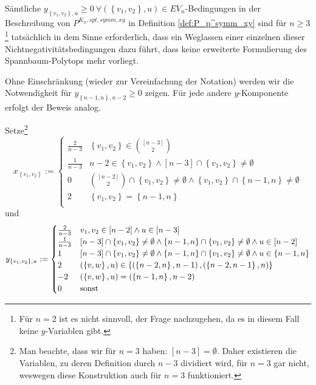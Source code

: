 \documentclass[10p,a4paper,BCOR = 12mm, DIV=15]{scrbook}
\begin{document}
\begin{Sa}
Sämtliche $y_{\left\{v_1, v_2\right\}, u} \geq 0 \ \forall \left(\left\{v_1, v_2\right\}, u\right) \in EV_n$-Bedingungen in der Beschreibung von $P^{K_n, spt, symm, xy}$ in Definition \ref{def:P_p^symm_xy} sind für $n\geq 3$\footnote{Für $n=2$ ist es nicht sinnvoll, der Frage nachzugehen, da es in diesem Fall keine $y$-Variablen gibt.} tatsächlich in dem Sinne erforderlich, dass ein Weglassen einer einzelnen dieser Nichtnegativitätsbedingungen dazu führt, dass keine erweiterte Formulierung des Spannbaum-Polytops mehr vorliegt.
\end{Sa}
\begin{bew}
Ohne Einschränkung (wieder zur Vereinfachung der Notation) werden wir die Notwendigkeit für $y_{\left\{n-1, n\right\}, n-2} \geq 0$ zeigen. Für jede andere $y$-Komponente erfolgt der Beweis analog.

Setze\footnote{Man beachte, dass wir für $n=3$  haben: $\left[n-3\right] = \emptyset$. Daher existieren die Variablen, zu deren Definition durch $n-3$ dividiert wird, für $n=3$ gar nicht, weswegen diese Konstruktion auch für $n=3$ funktioniert.}
\begin{displaymath}
x_{\left\{v_1, v_2\right\}} := \begin{cases}
\frac{2}{n-3} & \left\{v_1, v_2\right\} \in {[n-3] \choose 2} \\
\frac{1}{n-3} & n-2 \in \left\{v_1, v_2\right\} \wedge \left[n-3\right] \cap \left\{v_1, v_2\right\} \neq \emptyset \\
0 & {[n-2] \choose 2} \cap \left\{v_1, v_2\right\} \neq \emptyset \wedge \left\{v_1, v_2\right\} \cap \left\{n-1, n\right\} \neq \emptyset \\
2 & \left\{v_1, v_2\right\} = \left\{n-1, n\right\} \\
\end{cases}
\end{displaymath}
und
\begin{displaymath}
y_{\left\{v_1, v_2\right\}, u} := \begin{cases}
\frac{2}{n-3} & v_1, v_2 \in \left[n-2\right] \wedge u \in \left[n-3\right] \\
\frac{1}{n-3} & \left[n-3\right] \cap \left\{v_1, v_2\right\} \neq \emptyset \wedge \left\{n-1, n\right\} \cap \left\{v_1, v_2\right\} \neq \emptyset \wedge u\in \left[n-2\right] \\
1 & \left[n-3\right] \cap \left\{v_1, v_2\right\} \neq \emptyset \wedge \left\{n-1, n\right\} \cap \left\{v_1, v_2\right\} \neq \emptyset \wedge u\in \left\{n-1, n\right\} \\
2 & \left(\left\{v, w\right\}, u\right) \in \left\{ \left(\left\{n-2, n\right\}, n-1\right), \left(\left\{n-2, n-1\right\}, n\right)\right\} \\
-2 & \left(\left\{v, w\right\}, u\right) = \left(\left\{n-1, n\right\}, n-2\right) \\
0 & \textnormal{sonst}
\end{cases}
\end{displaymath}


\end{bew}
\end{document}
